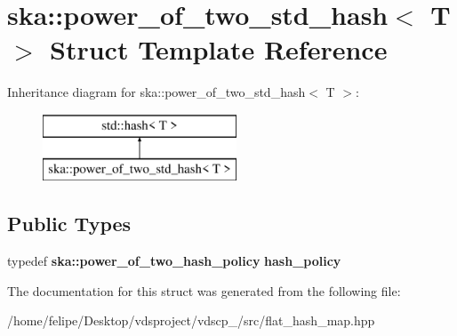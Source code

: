 \section{ska\+:\+:power\+\_\+of\+\_\+two\+\_\+std\+\_\+hash$<$ T $>$ Struct Template Reference}
\label{structska_1_1power__of__two__std__hash}
Inheritance diagram for ska\+:\+:power\+\_\+of\+\_\+two\+\_\+std\+\_\+hash$<$ T $>$\+:\begin{figure}[H]
\begin{center}
\leavevmode
\includegraphics[height=2.000000cm]{structska_1_1power__of__two__std__hash}
\end{center}
\end{figure}
\subsection*{Public Types}
\begin{DoxyCompactItemize}
\item 
typedef {\bf ska\+::power\+\_\+of\+\_\+two\+\_\+hash\+\_\+policy} {\bfseries hash\+\_\+policy}\label{structska_1_1power__of__two__std__hash_a47c92f03fb274333eb6bf590cfc472b4}

\end{DoxyCompactItemize}


The documentation for this struct was generated from the following file\+:\begin{DoxyCompactItemize}
\item 
/home/felipe/\+Desktop/vdsproject/vdscp\+\_/src/flat\+\_\+hash\+\_\+map.\+hpp\end{DoxyCompactItemize}
